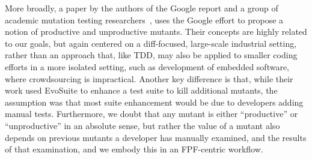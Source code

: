 More broadly, a paper by the
authors of the Google report and a group of academic mutation testing
researchers~\cite{ivankovic2018industrial}, uses the Google effort to
propose a notion of productive and unproductive mutants.  Their
concepts are highly related to our goals, but again centered on a
diff-focused, large-scale industrial setting, rather than an approach
that, like TDD, may also be applied to smaller coding efforts in a more
isolated setting, such as development of embedded software, where
crowdsourcing is impractical.  Another key difference is that, while their
work used EvoSuite to enhance a test suite to kill additional mutants,
the assumption was that most suite enhancement would be due to
developers adding manual tests.  Furthermore, we doubt that any mutant
is either ``productive'' or ``unproductive'' in an absolute sense, but
rather the value of a mutant also depends on previous mutants a
developer has manually examined, and the results of that examination,
and we embody this in an FPF-centric workflow.